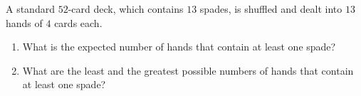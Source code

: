 A standard $52$-card deck, which contains $13$ spades, is shuffled and dealt into $13$ hands of $4$ cards each.
\begin{enumerate}
\item[(a)] What is the expected number of hands that contain at least one spade?
\item[(b)] What are the least and the greatest possible numbers of hands that contain at least one spade?
\end{enumerate}
